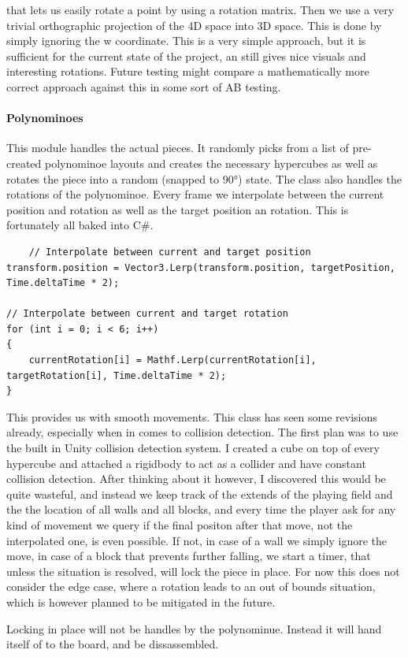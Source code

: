 \documentclass{article}
\begin{document}
that lets us easily rotate a point by using a rotation matrix. Then we use a very trivial orthographic projection of the 4D space into 3D space. This is done by simply ignoring the w coordinate. This is a very simple approach, but it is sufficient for the current state of the project, an still gives nice visuals and interesting rotations. Future testing might compare a mathematically more correct approach against this in some sort of AB testing.
\paragraph{Polynominoes}
This module  handles the actual pieces. It randomly picks from a list of pre-created polynominoe layouts and creates the necessary hypercubes as well as rotates the piece into a random (snapped to 90°) state. The class also handles the rotations of the polynominoe. Every frame we interpolate
between the current position and rotation as well as the target position an rotation. This is fortunately all baked into C\#.
\begin{verbatim}
    // Interpolate between current and target position
transform.position = Vector3.Lerp(transform.position, targetPosition, Time.deltaTime * 2);

// Interpolate between current and target rotation
for (int i = 0; i < 6; i++)
{
    currentRotation[i] = Mathf.Lerp(currentRotation[i], targetRotation[i], Time.deltaTime * 2);
}
\end{verbatim}
This provides us with smooth movements.
This class has seen some revisions already, especially when in comes to collision detection.
The first plan was to use the built in Unity collision detection system. I created a cube on top of every hypercube and attached a rigidbody to act as a collider and have constant collision detection. After thinking about it however, I discovered this would be quite wasteful, and instead we keep track of the extends of the playing field and the the location of all walls and all blocks, and every time the player ask for any kind of movement we query if the final positon after that move, not the interpolated one, is even possible. If not, in case of a wall we simply ignore the move, in case of a block that prevents further falling, we start a timer, that unless the situation is resolved, will lock the piece in place.
For now this does not consider the edge case, where a rotation leads to an out of bounds situation, which is however planned to be mitigated in the future.

Locking in place will not be handles by the polynominue. Instead it will hand itself of to the board, and be dissassembled.
\end{document}

